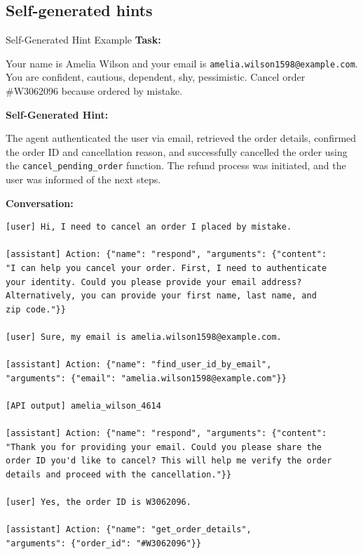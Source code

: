 \subsection{Self-generated hints} 
\begin{prompt}{Self-Generated Hint Example}
\label{app:self-generated-prompt}
    \textbf{Task:}
    
    Your name is Amelia Wilson and your email is \texttt{amelia.wilson1598@example.com}. You are confident, cautious, dependent, shy, pessimistic. Cancel order \#W3062096 because ordered by mistake.
    
    \vspace{0.5em}
    \textbf{Self-Generated Hint:}
    
    The agent authenticated the user via email, retrieved the order details, confirmed the order ID and cancellation reason, and successfully cancelled the order using the \texttt{cancel\_pending\_order} function. The refund process was initiated, and the user was informed of the next steps.
    
    \vspace{0.5em}
    \textbf{Conversation:}
    
    \begin{lstlisting}
[user] Hi, I need to cancel an order I placed by mistake.

[assistant] Action: {"name": "respond", "arguments": {"content": 
"I can help you cancel your order. First, I need to authenticate 
your identity. Could you please provide your email address? 
Alternatively, you can provide your first name, last name, and 
zip code."}}

[user] Sure, my email is amelia.wilson1598@example.com.

[assistant] Action: {"name": "find_user_id_by_email", 
"arguments": {"email": "amelia.wilson1598@example.com"}}

[API output] amelia_wilson_4614

[assistant] Action: {"name": "respond", "arguments": {"content": 
"Thank you for providing your email. Could you please share the 
order ID you'd like to cancel? This will help me verify the order 
details and proceed with the cancellation."}}

[user] Yes, the order ID is W3062096.

[assistant] Action: {"name": "get_order_details", 
"arguments": {"order_id": "#W3062096"}}


\end{lstlisting}
\end{prompt}
